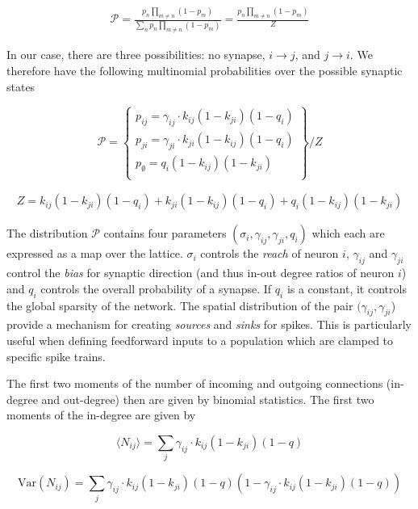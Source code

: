 \documentclass{ucetd}
\begin{document}
\begin{align*}
\mathcal{P} = \frac{p_{n}\prod_{m\neq n}(1-p_{m})}{\sum_{n}p_{n}\prod_{m\neq n}(1-p_{m})} = \frac{p_{n}\prod_{m\neq n}(1-p_{m})}{Z}
\end{align*}

In our case, there are three possibilities: no synapse, $i\rightarrow j$, and $j\rightarrow i$. We therefore have the following multinomial probabilities over the possible synaptic states

  \[
    \mathcal{P} = \left\{\begin{array}{lr}
        p_{ij} = \gamma_{ij}\cdot k_{ij}(1-k_{ji})(1-q_{i})\\
        p_{ji} = \gamma_{ji}\cdot k_{ji}(1-k_{ij})(1-q_{i})\\
        p_{\emptyset} = q_{i}(1-k_{ij})(1-k_{ji})\\
        \end{array}\right\}/Z
  \]
  
\begin{align*}
Z = k_{ij}(1-k_{ji})(1-q_{i}) + k_{ji}(1-k_{ij})(1-q_{i}) + q_{i}(1-k_{ij})(1-k_{ji})
\end{align*}

The distribution $\mathcal{P}$ contains four parameters $(\sigma_{i},\gamma_{ij},\gamma_{ji},q_{i})$ which each are expressed as a map over the lattice. $\sigma_{i}$ controls the \emph{reach} of neuron $i$, $\gamma_{ij}$ and $\gamma_{ji}$ control the \emph{bias} for synaptic direction (and thus in-out degree ratios of neuron $i$) and $q_{i}$ controls the overall probability of a synapse. If $q_{i}$ is a constant, it controls the global sparsity of the network. The spatial distribution of the pair $(\gamma_{ij},\gamma_{ji}$) provide a mechanism for creating \emph{sources} and \emph{sinks} for spikes. This is particularly useful when defining feedforward inputs to a population which are clamped to specific spike trains. 

The first two moments of  the number of incoming and outgoing connections (in-degree and out-degree) then are given by binomial statistics. The first two moments of the in-degree are given by

\begin{equation*}
\langle N_{ij} \rangle = \sum_{j} \gamma_{ij}\cdot k_{ij}(1-k_{ji})(1-q)
\end{equation*}

\begin{equation*}
\mathrm{Var}(N_{ij}) = \sum_{j}\gamma_{ij}\cdot k_{ij}(1-k_{ji})(1-q)(1-\gamma_{ij}\cdot k_{ij}(1-k_{ji})(1-q))
\end{equation*}
\end{document}
